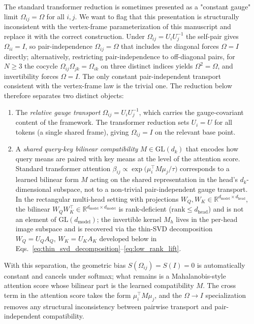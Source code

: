 \documentclass[11pt]{article}
\begin{document}
The standard transformer reduction is sometimes presented as a "constant gauge" limit $\Omega_{ij} = \Omega$ for all $i,j$. We want to flag that this presentation is structurally inconsistent with the vertex-frame parameterization of this manuscript and replace it with the correct construction. Under $\Omega_{ij} = U_iU_j^{-1}$ the self-pair gives $\Omega_{ii} = I$, so pair-independence $\Omega_{ij} = \Omega$ that includes the diagonal forces $\Omega = I$ directly; alternatively, restricting pair-independence to off-diagonal pairs, for $N \geq 3$ the cocycle $\Omega_{ij}\Omega_{jk} = \Omega_{ik}$ on three distinct indices yields $\Omega^2 = \Omega$, and invertibility forces $\Omega = I$. The only constant pair-independent transport consistent with the vertex-frame law is the trivial one. The reduction below therefore separates two distinct objects:
\begin{enumerate}
\item The \emph{relative gauge transport} $\Omega_{ij} = U_iU_j^{-1}$, which carries the gauge-covariant content of the framework. The transformer reduction sets $U_i = U$ for all tokens (a single shared frame), giving $\Omega_{ij} = I$ on the relevant base point.
\item A \emph{shared query-key bilinear compatibility} $M \in \mathrm{GL}(d_k)$ that encodes how query means are paired with key means at the level of the attention score. Standard transformer attention $\beta_{ij} \propto \exp\big(\mu_i^\top M \mu_j / \tau\big)$ corresponds to a learned bilinear form $M$ acting on the shared representation in the head's $d_k$-dimensional subspace, not to a non-trivial pair-independent gauge transport. In the rectangular multi-head setting with projections $W_Q, W_K \in \mathbb{R}^{d_{\text{model}} \times d_{\text{head}}}$, the bilinear $W_Q W_K^\top \in \mathbb{R}^{d_{\text{model}}\times d_{\text{model}}}$ is rank-deficient ($\mathrm{rank} \le d_{\text{head}}$) and is not an element of $\mathrm{GL}(d_{\text{model}})$; the invertible kernel $M_h$ lives in the per-head image subspace and is recovered via the thin-SVD decomposition $W_Q = U_Q A_Q$, $W_K = U_K A_K$ developed below in Eqs.~\eqref{eq:thin_svd_decomposition}--\eqref{eq:low_rank_lift}.
\end{enumerate}
With this separation, the geometric bias $S(\Omega_{ij}) = S(I) = 0$ is automatically constant and cancels under softmax; what remains is a Mahalanobis-style attention score whose bilinear part is the learned compatibility $M$. The cross term in the attention score takes the form $\mu_i^\top M \mu_j$, and the $\Omega \to I$ specialization removes any structural inconsistency between pairwise transport and pair-independent compatibility.
\end{document}
